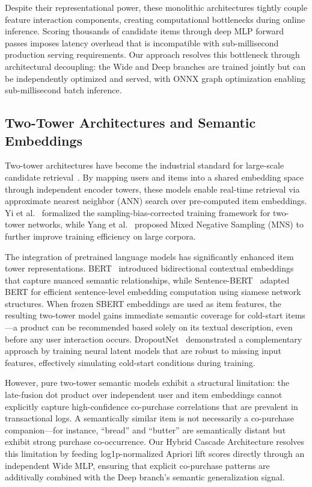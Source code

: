\documentclass[10pt,conference]{IEEEtran}
\begin{document}
Despite their representational power, these monolithic architectures tightly couple feature interaction components, creating computational bottlenecks during online inference. Scoring thousands of candidate items through deep MLP forward passes imposes latency overhead that is incompatible with sub-millisecond production serving requirements. Our approach resolves this bottleneck through architectural decoupling: the Wide and Deep branches are trained jointly but can be independently optimized and served, with ONNX graph optimization enabling sub-millisecond batch inference.

\subsection{Two-Tower Architectures and Semantic Embeddings}
\label{subsec:two_tower_semantic}

Two-tower architectures have become the industrial standard for large-scale candidate retrieval~\cite{covington2016deep, yi2019sampling}. By mapping users and items into a shared embedding space through independent encoder towers, these models enable real-time retrieval via approximate nearest neighbor (ANN) search over pre-computed item embeddings. Yi et al.~\cite{yi2019sampling} formalized the sampling-bias-corrected training framework for two-tower networks, while Yang et al.~\cite{yang2020mixed} proposed Mixed Negative Sampling (MNS) to further improve training efficiency on large corpora.

The integration of pretrained language models has significantly enhanced item tower representations. BERT~\cite{devlin2019bert} introduced bidirectional contextual embeddings that capture nuanced semantic relationships, while Sentence-BERT~\cite{reimers2019sentence} adapted BERT for efficient sentence-level embedding computation using siamese network structures. When frozen SBERT embeddings are used as item features, the resulting two-tower model gains immediate semantic coverage for cold-start items---a product can be recommended based solely on its textual description, even before any user interaction occurs. DropoutNet~\cite{volkovs2017dropoutnet} demonstrated a complementary approach by training neural latent models that are robust to missing input features, effectively simulating cold-start conditions during training.

However, pure two-tower semantic models exhibit a structural limitation: the late-fusion dot product over independent user and item embeddings cannot explicitly capture high-confidence co-purchase correlations that are prevalent in transactional logs. A semantically similar item is not necessarily a co-purchase companion---for instance, ``bread'' and ``butter'' are semantically distant but exhibit strong purchase co-occurrence. Our Hybrid Cascade Architecture resolves this limitation by feeding log1p-normalized Apriori lift scores directly through an independent Wide MLP, ensuring that explicit co-purchase patterns are additivally combined with the Deep branch's semantic generalization signal.
\end{document}
